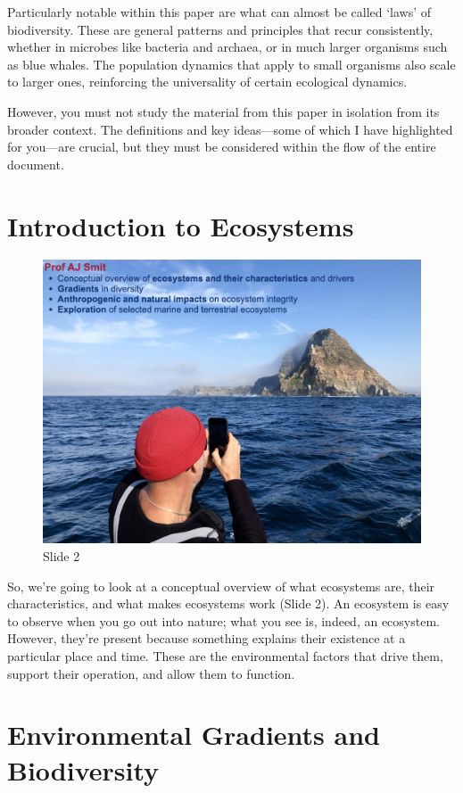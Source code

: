 \documentclass[
  11pt,
]{book}
\begin{document}
Particularly notable within this paper are what can almost be called
`laws' of biodiversity. These are general patterns and principles that
recur consistently, whether in microbes like bacteria and archaea, or in
much larger organisms such as blue whales. The population dynamics that
apply to small organisms also scale to larger ones, reinforcing the
universality of certain ecological dynamics.

However, you must not study the material from this paper in isolation
from its broader context. The definitions and key ideas---some of which
I have highlighted for you---are crucial, but they must be considered
within the flow of the entire document.

\section{Introduction to Ecosystems}\label{introduction-to-ecosystems}

\begin{figure}[ht]
\centering
\includegraphics[width=0.8\linewidth]{../images/BDC334/BDC334-002.jpeg}
\caption*{Slide 2}
\end{figure}

So, we're going to look at a conceptual overview of what ecosystems are,
their characteristics, and what makes ecosystems work (Slide 2). An
ecosystem is easy to observe when you go out into nature; what you see
is, indeed, an ecosystem. However, they're present because something
explains their existence at a particular place and time. These are the
environmental factors that drive them, support their operation, and
allow them to function.

\section{Environmental Gradients and
Biodiversity}\label{environmental-gradients-and-biodiversity}
\end{document}
